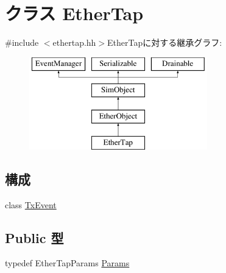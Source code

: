\hypertarget{classEtherTap}{
\section{クラス EtherTap}
\label{classEtherTap}
}


{\ttfamily \#include $<$ethertap.hh$>$}EtherTapに対する継承グラフ:\begin{figure}[H]
\begin{center}
\leavevmode
\includegraphics[height=4cm]{classEtherTap}
\end{center}
\end{figure}
\subsection*{構成}
\begin{DoxyCompactItemize}
\item 
class \hyperlink{classEtherTap_1_1TxEvent}{TxEvent}
\end{DoxyCompactItemize}
\subsection*{Public 型}
\begin{DoxyCompactItemize}
\item 
typedef EtherTapParams \hyperlink{classEtherTap_a0d1f916d5d6c5769fc7f043e0f4a6372}{Params}
\end{DoxyCompactItemize}
